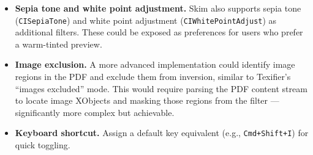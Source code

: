 \documentclass[11pt,a4paper]{article}
\begin{document}
\begin{itemize}
    \item \textbf{Sepia tone and white point adjustment.} Skim also supports
        sepia tone (\texttt{CISepiaTone}) and white point adjustment
        (\texttt{CIWhitePointAdjust}) as additional filters. These could be
        exposed as preferences for users who prefer a warm-tinted preview.
    \item \textbf{Image exclusion.} A more advanced implementation could
        identify image regions in the PDF and exclude them from inversion,
        similar to Texifier's ``images excluded'' mode. This would require
        parsing the PDF content stream to locate image XObjects and masking
        those regions from the filter --- significantly more complex but
        achievable.
    \item \textbf{Keyboard shortcut.} Assign a default key equivalent (e.g.,
        \texttt{Cmd+Shift+I}) for quick toggling.
\end{itemize}
\end{document}
